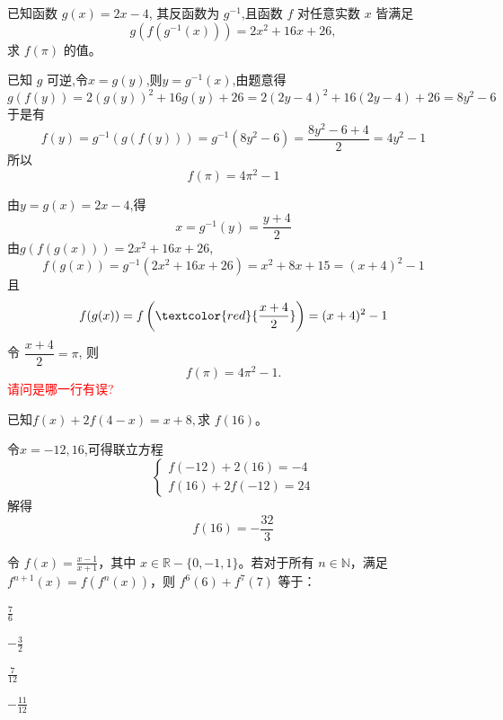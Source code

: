 \begin{questions}
    \question 已知函数 $g(x)=2x-4$, 其反函数为 $g^{-1}$,且函数 $f$ 对任意实数 $x$ 皆满足
    \[
    g(f(g^{-1}(x))) = 2x^2 + 16x + 26,
    \]
    求 $f(\pi)$ 的值。
    \begin{solution}
        已知 $g$ 可逆,令$x=g(y)$,则$y=g^{-1}(x)$,由题意得
        \[
        g(f(y)) = 2(g(y))^2 + 16g(y) + 26 
        = 2(2y-4)^2 + 16(2y-4) + 26 = 8y^2 - 6
        \]
        于是有
        \[
        f(y) = g^{-1}(g(f(y)))= g^{-1}(8y^2 - 6) = \frac{8y^2 -6 +4}{2} = 4y^2 - 1
        \]
        所以
        \[
        f(\pi) = 4\pi^2 - 1
        \]
    \end{solution}
\begin{solution}
    由$y=g(x)=2x-4$,得
    \[
    x=g^{-1}(y) = \frac{y+4}{2}
    \]
    由$g(f(g(x))) = 2x^2 + 16x + 26$,
    \[
    f(g(x)) = g^{-1}(2x^2 + 16x + 26) = x^2 + 8x + 15 = (x+4)^2 - 1
    \]
    且
    \[
    f(g(x)) = f\left(\textcolor{red}{\frac{x+4}{2}}\right) = (x+4)^2 - 1
    \]
    令 $\dfrac{x+4}{2} = \pi$, 则
    \[
    f(\pi) = 4\pi^2 - 1.
    \]
    \textcolor{red}{请问是哪一行有误?}
\end{solution}

        
    


    \question 已知$f(x) + 2 f(4-x) = x + 8,$求 $f(16)$。 
    \begin{solution}
        令$x=-12,16$,可得联立方程
        \[
        \begin{cases}
            f(-12)+2(16)=-4\\f(16)+2f(-12)=24
        \end{cases}
        \]
        解得 $$f(16)= -\dfrac{32}{3}$$
    \end{solution}

    \question 
令 $f(x) = \frac{x-1}{x+1}$，其中 $x \in \mathbb{R} - \{0, -1, 1\}$。若对于所有 $n \in \mathbb{N}$，满足 $f^{n+1}(x) = f(f^n(x))$，则 $f^6(6) + f^7(7)$ 等于：
\begin{choices}
    \item $\frac{7}{6}$
    \item $-\frac{3}{2}$
    \item $\frac{7}{12}$
    \item $-\frac{11}{12}$
\end{choices}


\end{questions}

